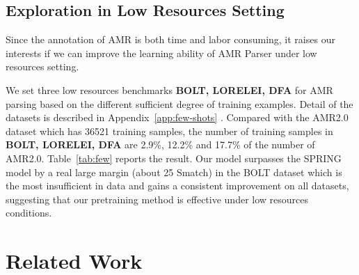 \documentclass[11pt]{article}
\begin{document}
\subsection{Exploration in Low Resources Setting}
\begin{table}[t]
    \centering
{}
    \caption{Model Smatch scores in the low-resource setting. There are 1061, 4441, 6455 examples in the training set of BOLT, LORELEI and DFA, respectively. The model exploits SRL as the intermediate task.}

    \label{tab:few}
\end{table} 
Since the annotation of AMR is both time and labor consuming, it raises our interests if we can improve the learning ability of AMR Parser under low resources setting. 

We set three low resources benchmarks  \textbf{BOLT, LORELEI, DFA} for AMR parsing based on the different sufficient degree of training examples. Detail of the datasets is described in Appendix~\ref{app:few-shots} . Compared with the AMR2.0 dataset which has 36521 training samples, the number of training samples in \textbf{BOLT, LORELEI, DFA} are 2.9\%, 12.2\% and 17.7\% of the number of AMR2.0. Table~\ref{tab:few} reports the result. Our model surpasses the SPRING model by a real large margin (about 25 Smatch) in the BOLT dataset which is the most insufficient in data and gains a consistent improvement on all datasets, suggesting that our pretraining method is effective under low resources conditions.  




 



 

\section{Related Work}
\end{document}
